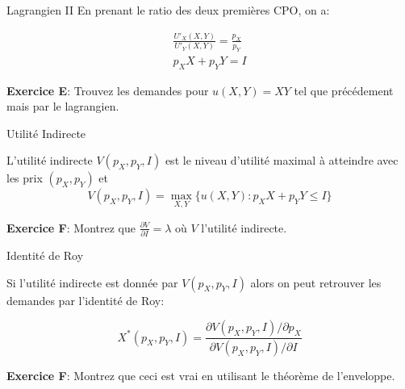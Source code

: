 \documentclass[handout]{beamer}
\begin{document}
\begin{frame}{Lagrangien II}
En prenant le ratio des deux premières CPO, on a:

\begin{align*}
\frac{U'_X(X,Y)}{U'_Y(X,Y)} = \frac{p_X}{p_Y} \\
p_X X + p_Y Y = I
\end{align*}

\textbf{Exercice E}: Trouvez les demandes pour $u(X,Y) = XY$ tel que précédement mais par le lagrangien. 
\newline

\end{frame}

\begin{frame}{Utilité Indirecte}

L'utilité indirecte $V(p_X,p_Y,I)$ est le niveau d'utilité maximal à atteindre avec les prix $(p_X,p_Y)$ et 
$$ V(p_X,p_Y,I) = \max_{X,Y} \{ u(X,Y) : p_X X + p_Y Y \le I\} $$

\textbf{Exercice F}: Montrez que $\frac{\partial V}{\partial I} = \lambda$ où $V$ l'utilité indirecte. 
\end{frame}

\begin{frame}{Identité de Roy}

Si l'utilité indirecte est donnée par $V(p_X,p_Y,I)$ alors on peut retrouver les demandes par l'identité de Roy: 

$$ X^*(p_X,p_Y,I) = \frac{\partial{V(p_X,p_Y,I)}/\partial{p_X}}{\partial{V(p_X,p_Y,I)}/\partial{I}}  $$

\textbf{Exercice F}: Montrez que ceci est vrai en utilisant le théorème de l'enveloppe. 
\end{frame}
\end{document}
